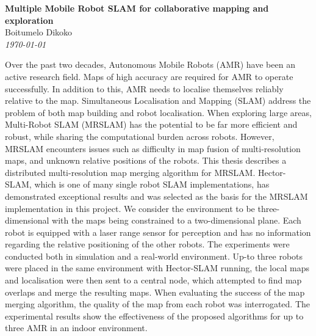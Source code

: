 \documentclass[a4paper, 12pt, oneside, openright, parskip=full]{book}
\newcommand{\auth}{Boitumelo Dikoko}								%
\newcommand{\titl}{Multiple Mobile Robot SLAM for collaborative mapping and exploration}						%
\begin{document}
%
\begin{center}
	\textbf{\Large \titl}\\
			\vskip 0.2cm
			\auth\\
			\vskip 0.2cm
	\textit{\footnotesize\today}
			\vskip 1cm
\end{center}
Over the past two decades, Autonomous Mobile Robots (AMR) have been an active research field. Maps of high accuracy are required for AMR to operate successfully. In addition to this, AMR needs to localise themselves reliably relative to the map. Simultaneous Localisation and Mapping (SLAM) address the problem of both map building and robot localisation. 
When exploring large areas, Multi-Robot SLAM (MRSLAM) has the potential to be far more efficient and robust, while sharing the computational burden across robots.  However, MRSLAM encounters issues such as difficulty in map fusion of multi-resolution maps, and unknown relative positions of the robots.
This thesis describes a distributed multi-resolution map merging algorithm for MRSLAM.  Hector-SLAM, which is one of many single robot SLAM implementations, has demonstrated exceptional results and was selected as the basis for the  MRSLAM implementation in this project. We consider the environment to be three-dimensional with the maps being constrained to a two-dimensional plane.  Each robot is equipped with a laser range sensor for perception and has no information regarding the relative positioning of the other robots.
The experiments were conducted both in simulation and a real-world environment. Up-to three robots were placed in the same environment with Hector-SLAM running, the local maps and localisation were then sent to a central node, which attempted to find map overlaps and merge the resulting maps. When evaluating the success of the map merging algorithm, the quality of the map from each robot was interrogated. The experimental results show the effectiveness of the proposed algorithms for up to three AMR in an indoor environment.
\end{document}

